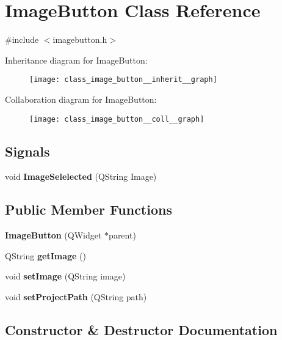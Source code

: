 \section{Image\+Button Class Reference}
\label{class_image_button}


{\ttfamily \#include $<$imagebutton.\+h$>$}



Inheritance diagram for Image\+Button\+:\nopagebreak
\begin{figure}[H]
\begin{center}
\leavevmode
\texttt{[image: class\_image\_button\_\_inherit\_\_graph]}
\end{center}
\end{figure}


Collaboration diagram for Image\+Button\+:\nopagebreak
\begin{figure}[H]
\begin{center}
\leavevmode
\texttt{[image: class\_image\_button\_\_coll\_\_graph]}
\end{center}
\end{figure}
\subsection*{Signals}
\begin{DoxyCompactItemize}
\item 
void \textbf{ Image\+Selelected} (Q\+String Image)
\end{DoxyCompactItemize}
\subsection*{Public Member Functions}
\begin{DoxyCompactItemize}
\item 
\textbf{ Image\+Button} (Q\+Widget $\ast$parent)
\item 
Q\+String \textbf{ get\+Image} ()
\item 
void \textbf{ set\+Image} (Q\+String image)
\item 
void \textbf{ set\+Project\+Path} (Q\+String path)
\end{DoxyCompactItemize}


\subsection{Constructor \& Destructor Documentation}
\mbox{\label{class_image_button_a80036bed71d46411aa0e6c74f1635087}} 
